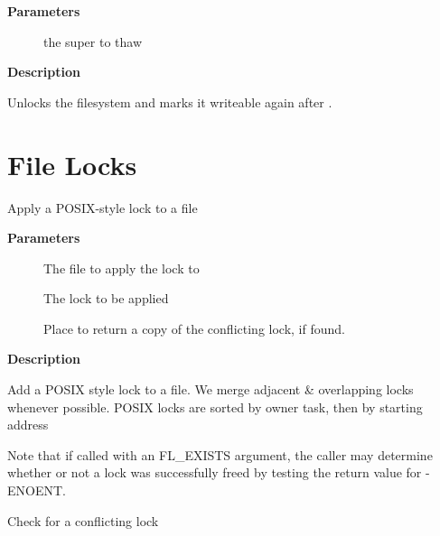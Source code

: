 \documentclass[a4paper,8pt,english]{sphinxmanual}
\begin{document}
\textbf{Parameters}
\begin{description}
\item[{}] \leavevmode
the super to thaw

\end{description}

\textbf{Description}

Unlocks the filesystem and marks it writeable again after {\hyperref[filesystems/index:c.freeze_super]{\emph{}}}.


\section{File Locks}
\label{filesystems/index:file-locks}

\begin{fulllineitems}
\label{filesystems/index:c.posix_lock_file}
Apply a POSIX-style lock to a file

\end{fulllineitems}


\textbf{Parameters}
\begin{description}
\item[{}] \leavevmode
The file to apply the lock to

\item[{}] \leavevmode
The lock to be applied

\item[{}] \leavevmode
Place to return a copy of the conflicting lock, if found.

\end{description}

\textbf{Description}

Add a POSIX style lock to a file.
We merge adjacent \& overlapping locks whenever possible.
POSIX locks are sorted by owner task, then by starting address

Note that if called with an FL\_EXISTS argument, the caller may determine
whether or not a lock was successfully freed by testing the return
value for -ENOENT.

\begin{fulllineitems}
\label{filesystems/index:c.locks_mandatory_area}
Check for a conflicting lock

\end{fulllineitems}
\end{document}
